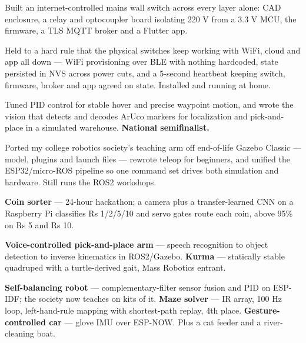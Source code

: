 \documentclass[a4paper,10pt]{article}
\begin{document}
\begin{points}
  \item Built an internet-controlled mains wall switch across every layer alone: CAD enclosure, a relay and optocoupler board isolating 220 V from a 3.3 V MCU, the firmware, a TLS MQTT broker and a Flutter app.
  \item Held to a hard rule that the physical switches keep working with WiFi, cloud and app all down --- WiFi provisioning over BLE with nothing hardcoded, state persisted in NVS across power cuts, and a 5-second heartbeat keeping switch, firmware, broker and app agreed on state. Installed and running at home.
\end{points}

\begin{points}
  \item Tuned PID control for stable hover and precise waypoint motion, and wrote the vision that detects and decodes ArUco markers for localization and pick-and-place in a simulated warehouse. \textbf{National semifinalist.}
\end{points}

\begin{points}
  \item Ported my college robotics society's teaching arm off end-of-life Gazebo Classic --- model, plugins and launch files --- rewrote teleop for beginners, and unified the ESP32/micro-ROS pipeline so one command set drives both simulation and hardware. Still runs the ROS2 workshops.
\end{points}

\begin{points}
  \item \textbf{Coin sorter} --- 24-hour hackathon; a camera plus a transfer-learned CNN on a Raspberry Pi classifies Rs 1/2/5/10 and servo gates route each coin, above 95\% on Rs 5 and Rs 10.
  \item \textbf{Voice-controlled pick-and-place arm} --- speech recognition to object detection to inverse kinematics in ROS2/Gazebo. \textbf{Kurma} --- statically stable quadruped with a turtle-derived gait, Mass Robotics entrant.
  \item \textbf{Self-balancing robot} --- complementary-filter sensor fusion and PID on ESP-IDF; the society now teaches on kits of it. \textbf{Maze solver} --- IR array, 100 Hz loop, left-hand-rule mapping with shortest-path replay, 4th place. \textbf{Gesture-controlled car} --- glove IMU over ESP-NOW. Plus a cat feeder and a river-cleaning boat.
\end{points}
\end{document}
